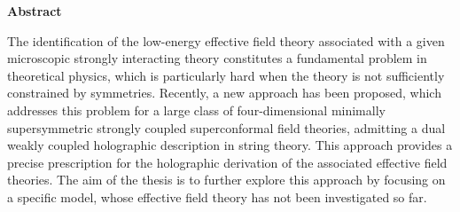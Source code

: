 




\thispagestyle{plain}
\begin{center}
    
    
    
    \textbf{Abstract}
\end{center}
The identification of the low-energy effective field theory associated with a given microscopic strongly interacting theory constitutes a fundamental problem in theoretical physics, which is particularly hard when the theory is not sufficiently constrained by symmetries.
Recently, a new approach has been proposed, which addresses this problem for a large class of four-dimensional minimally supersymmetric strongly coupled superconformal field theories, admitting a dual weakly coupled holographic description in string theory. This approach provides a precise prescription for the holographic derivation of the associated effective field theories. The aim of the thesis is to further explore this approach by focusing on a specific model, whose effective field theory has not been investigated so far. 

